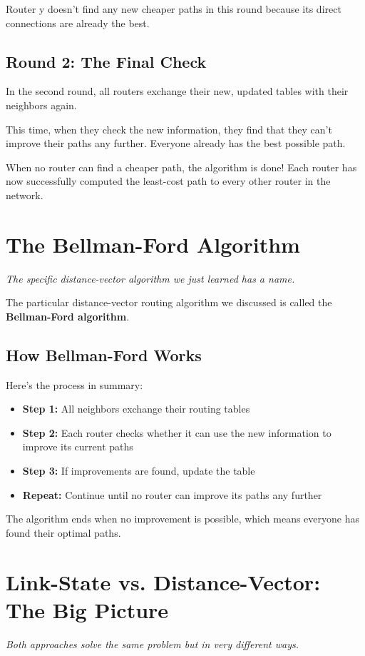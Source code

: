 \documentclass[../../compsys.tex]{subfiles}
\begin{document}
Router y doesn't find any new cheaper paths in this round because its direct connections are already the best.

\subsection{Round 2: The Final Check}
In the second round, all routers exchange their new, updated tables with their neighbors again.

This time, when they check the new information, they find that they can't improve their paths any further. Everyone already has the best possible path.

When no router can find a cheaper path, the algorithm is done! Each router has now successfully computed the least-cost path to every other router in the network.

\section{The Bellman-Ford Algorithm}
\textit{The specific distance-vector algorithm we just learned has a name.}

The particular distance-vector routing algorithm we discussed is called the \textbf{Bellman-Ford algorithm}.

\subsection{How Bellman-Ford Works}
Here's the process in summary:
\begin{itemize}
    \item \textbf{Step 1:} All neighbors exchange their routing tables
    \item \textbf{Step 2:} Each router checks whether it can use the new information to improve its current paths
    \item \textbf{Step 3:} If improvements are found, update the table
    \item \textbf{Repeat:} Continue until no router can improve its paths any further
\end{itemize}

The algorithm ends when no improvement is possible, which means everyone has found their optimal paths.

\section{Link-State vs. Distance-Vector: The Big Picture}
\textit{Both approaches solve the same problem but in very different ways.}
\end{document}
